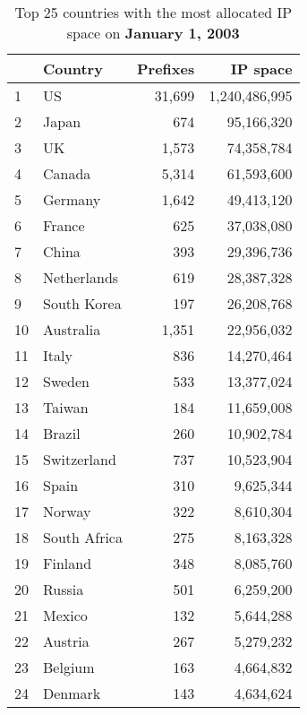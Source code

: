 \begin{table*}[p]
\begin{minipage}[t]{0.48\textwidth}
	\begin{center}
	\caption{Top 25 countries with the most allocated IP space on \textbf{January 1, 2003}}
	\label{tab:top25 rir ip space 2003}
	\begin{tabular}{|l||l|r|r|}
		\hline
		&      \bf Country		& \bf Prefixes  &  \bf IP space 		\tabularnewline \hline 
1       &       US      		&       31,699  &       1,240,486,995   \tabularnewline
2       &       Japan   		&       674     &       95,166,320      \tabularnewline
3       &       UK      		&       1,573   &       74,358,784      \tabularnewline
4       &       Canada  		&       5,314   &       61,593,600      \tabularnewline
5       &       Germany 		&       1,642   &       49,413,120      \tabularnewline
6       &       France  		&       625     &       37,038,080      \tabularnewline
7       &       China   		&       393     &       29,396,736      \tabularnewline
8       &       Netherlands     &       619     &       28,387,328      \tabularnewline
9       &       South Korea     &       197     &       26,208,768      \tabularnewline
10      &       Australia       &       1,351   &       22,956,032      \tabularnewline
11      &       Italy   		&       836     &       14,270,464      \tabularnewline
12      &       Sweden  		&       533     &       13,377,024      \tabularnewline
13      &       Taiwan  		&       184     &       11,659,008      \tabularnewline
14      &       Brazil  		&       260     &       10,902,784      \tabularnewline
15      &       Switzerland     &       737     &       10,523,904      \tabularnewline
16      &       Spain   		&       310     &       9,625,344       \tabularnewline
17      &       Norway  		&       322     &       8,610,304       \tabularnewline
18      &       South Africa    &       275     &       8,163,328       \tabularnewline
19      &       Finland 		&       348     &       8,085,760       \tabularnewline
20      &       Russia  		&       501     &       6,259,200       \tabularnewline
21      &       Mexico  		&       132     &       5,644,288       \tabularnewline
22      &       Austria 		&       267     &       5,279,232       \tabularnewline
23      &       Belgium 		&       163     &       4,664,832       \tabularnewline
24      &       Denmark 		&       143     &       4,634,624       \tabularnewline

\end{tabular}
\end{center}
\end{minipage}
\end{table*}
